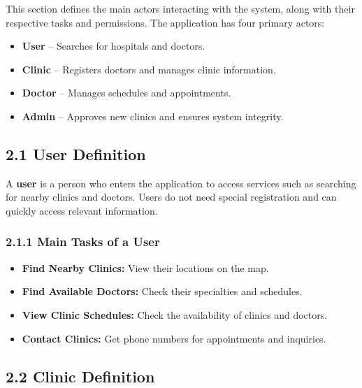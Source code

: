 \documentclass[12pt]{report}
\begin{document}
\noindent This section defines the main actors interacting with the system, along with their respective tasks and permissions. The application has four primary actors:
\begin{itemize}
	\item \textbf{User} – Searches for hospitals and doctors.
	\item \textbf{Clinic} – Registers doctors and manages clinic information.
	\item \textbf{Doctor} – Manages schedules and appointments.
	\item \textbf{Admin} – Approves new clinics and ensures system integrity.
\end{itemize}

\subsection*{\textbf{2.1 User Definition}}
\noindent A \textbf{user} is a person who enters the application to access services such as searching for nearby clinics and doctors. Users do not need special registration and can quickly access relevant information.

\subsubsection*{\textbf{2.1.1 Main Tasks of a User}}

\begin{itemize}
	\item \textbf{Find Nearby Clinics:} View their locations on the map.
	\item \textbf{Find Available Doctors:} Check their specialties and schedules.
	\item \textbf{View Clinic Schedules:} Check the availability of clinics and doctors.
	\item \textbf{Contact Clinics:} Get phone numbers for appointments and inquiries.
\end{itemize}

\vspace{0.5cm}

\subsection*{\textbf{2.2 Clinic Definition}}
\end{document}
